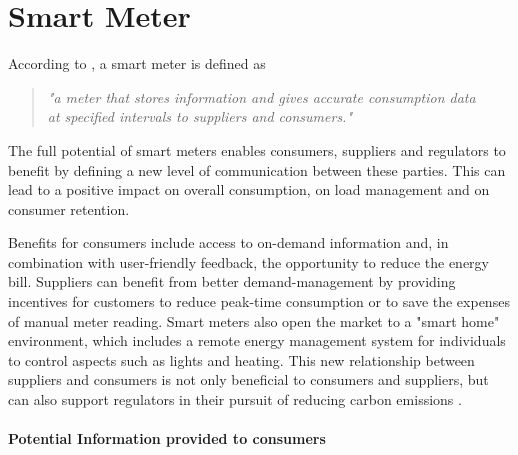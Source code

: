 \section{Smart Meter}
\label{ch:Content1:sec:Smart Meter}
According to \cite{Darby2008}, a smart meter is defined as
\begin{quotation}
\textit{"a meter that stores information and gives accurate consumption data\\ 
at specified intervals to suppliers and consumers."}
\end{quotation}

The full potential of smart meters enables consumers, suppliers and regulators to benefit by defining a new level of communication between these parties.  This can lead to a positive impact on overall consumption, on load management and on consumer retention.

Benefits for consumers include access to on-demand information and, in combination with user-friendly feedback, the opportunity to reduce the energy bill.
Suppliers can benefit from better demand-management by providing incentives for customers to reduce peak-time consumption or to save the expenses of manual meter reading. Smart meters also open the market to a "smart home" environment, which includes a remote energy management system for individuals to control aspects such as lights and heating.
This new relationship between suppliers and consumers is not only beneficial to consumers and suppliers, but can also support regulators in their pursuit of reducing carbon emissions  \citep{Darby2008}.

\paragraph{Potential Information provided to consumers}

